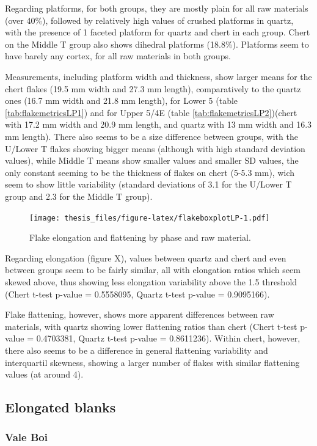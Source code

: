 \documentclass[12pt,twoside]{reedthesis}
\begin{document}
Regarding platforms, for both groups, they are mostly plain for all raw materials (over 40\%), followed by relatively high values of crushed platforms in quartz, with the presence of 1 faceted platform for quartz and chert in each group. Chert on the Middle T group also shows dihedral platforms (18.8\%). Platforms seem to have barely any cortex, for all raw materials in both groups.

Measurements, including platform width and thickness, show larger means for the chert flakes (19.5 mm width and 27.3 mm length), comparatively to the quartz ones (16.7 mm width and 21.8 mm length), for Lower 5 (table \ref{tab:flakemetricsLP1}) and for Upper 5/4E (table \ref{tab:flakemetricsLP2})(chert with 17.2 mm width and 20.9 mm length, and quartz with 13 mm width and 16.3 mm length). There also seems to be a size difference between groups, with the U/Lower T flakes showing bigger means (although with high standard deviation values), while Middle T means show smaller values and smaller SD values, the only constant seeming to be the thickness of flakes on chert (5-5.3 mm), wich seem to show little variability (standard deviations of 3.1 for the U/Lower T group and 2.3 for the Middle T group).
\begin{figure}
\centering
\texttt{[image: thesis\_files/figure-latex/flakeboxplotLP-1.pdf]}
\caption{\label{fig:flakeboxplotLP}Flake elongation and flattening by phase and raw material.}
\end{figure}
Regarding elongation (figure X), values between quartz and chert and even between groups seem to be fairly similar, all with elongation ratios which seem skewed above, thus showing less elongation variability above the 1.5 threshold (Chert t-test p-value = 0.5558095, Quartz t-test p-value = 0.9095166).

Flake flattening, however, shows more apparent differences between raw materials, with quartz showing lower flattening ratios than chert (Chert t-test p-value = 0.4703381, Quartz t-test p-value = 0.8611236). Within chert, however, there also seems to be a difference in general flattening variability and interquartil skewness, showing a larger number of flakes with similar flattening values (at around 4).

\hypertarget{elongated-blanks}{%
\subsection{Elongated blanks}\label{elongated-blanks}}

\hypertarget{vale-boi-6}{%
\subsubsection{Vale Boi}\label{vale-boi-6}}
\end{document}
